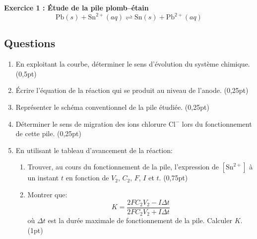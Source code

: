 \documentclass[12pt, french]{article}
\begin{document}
\begin{Box2}{\textbf{Exercice 1 : Étude de la pile plomb–étain}}
\begin{equation}
    \text{Pb}(s) + \text{Sn}^{2+}(aq) \rightleftharpoons \text{Sn}(s) + \text{Pb}^{2+}(aq)
\end{equation}

\subsection*{Questions} 
\begin{enumerate}
    \item En exploitant la courbe, déterminer le sens d’évolution du système chimique. (0,5pt)
    \item Écrire l’équation de la réaction qui se produit au niveau de l’anode. (0,25pt)
    \item Représenter le schéma conventionnel de la pile étudiée. (0,25pt)
    \item Déterminer le sens de migration des ions chlorure $\text{Cl}^-$ lors du fonctionnement de cette pile. (0,25pt)
    \item En utilisant le tableau d’avancement de la réaction:
    \begin{enumerate}
        \item Trouver, au cours du fonctionnement de la pile, l’expression de $[\text{Sn}^{2+}]$ à un instant $t$ en fonction de $V_2$, $C_2$, $F$, $I$ et $t$. (0,75pt)
        \item Montrer que:
        \begin{equation}
            K = \frac{2FC_2V_2 - I \Delta t}{2FC_2V_2 + I \Delta t}
        \end{equation}
        où $\Delta t$ est la durée maximale de fonctionnement de la pile. Calculer $K$. (1pt)
    \end{enumerate}
\end{enumerate}

\end{Box2}

\end{document}
